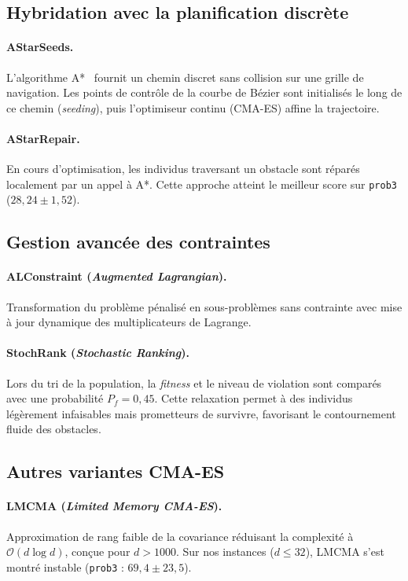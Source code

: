 \subsection{Hybridation avec la planification discrète}

\paragraph{AStarSeeds.}
L'algorithme A*~\cite{hart1968} fournit un chemin discret sans collision sur
une grille de navigation.  Les points de contrôle de la courbe de Bézier sont
initialisés le long de ce chemin (\textit{seeding}), puis l'optimiseur continu
(CMA-ES) affine la trajectoire.

\paragraph{AStarRepair.}
En cours d'optimisation, les individus traversant un obstacle sont réparés
localement par un appel à A*.  Cette approche atteint le meilleur score sur
\texttt{prob3} ($28{,}24 \pm 1{,}52$).

\subsection{Gestion avancée des contraintes}

\paragraph{ALConstraint (\textit{Augmented Lagrangian}).}
Transformation du problème pénalisé en sous-problèmes sans contrainte avec
mise à jour dynamique des multiplicateurs de Lagrange.

\paragraph{StochRank (\textit{Stochastic Ranking}).}
Lors du tri de la population, la \textit{fitness} et le niveau de violation sont
comparés avec une probabilité $P_f = 0{,}45$.  Cette relaxation permet à des
individus légèrement infaisables mais prometteurs de survivre, favorisant le
contournement fluide des obstacles.

\subsection{Autres variantes CMA-ES}

\paragraph{LMCMA (\textit{Limited Memory CMA-ES}).}
Approximation de rang faible de la covariance réduisant la complexité à
$\mathcal{O}(d \log d)$, conçue pour $d > 1000$.  Sur nos instances ($d \leq 32$),
LMCMA s'est montré instable (\texttt{prob3} : $69{,}4 \pm 23{,}5$).

